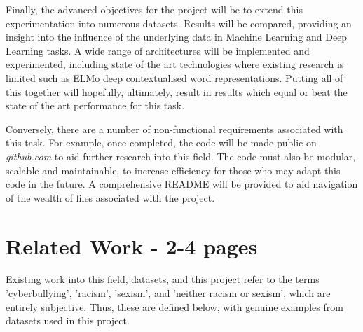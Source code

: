 \documentclass[12pt,a4paper]{article}
\begin{document}
Finally, the advanced objectives for the project will be to extend this experimentation into numerous datasets. Results will be compared, providing an insight into the influence of the underlying data in Machine Learning and Deep Learning tasks. A wide range of architectures will be implemented and experimented, including state of the art technologies where existing research is limited such as ELMo deep contextualised word representations. Putting all of this together will hopefully, ultimately, result in results which equal or beat the state of the art performance for this task.

Conversely, there are a number of non-functional requirements associated with this task. For example, once completed, the code will be made public on \textit{github.com} to aid further research into this field. The code must also be modular, scalable and maintainable, to increase efficiency for those who may adapt this code in the future. A comprehensive README will be provided to aid navigation of the wealth of files associated with the project.




\section{Related Work - 2-4 pages}

Existing work into this field, datasets, and this project refer to the terms 'cyberbullying', 'racism', 'sexism', and 'neither racism or sexism', which are entirely subjective. Thus, these are defined below, with genuine examples from datasets used in this project.
\end{document}
